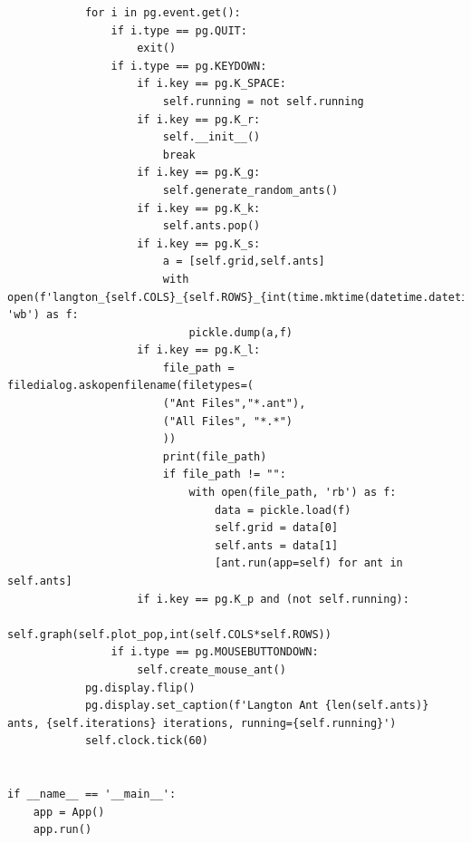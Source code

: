 \documentclass[10pt]{article}
\begin{document}
\begin{verbatim}
            for i in pg.event.get():
                if i.type == pg.QUIT:
                    exit()
                if i.type == pg.KEYDOWN:
                    if i.key == pg.K_SPACE:
                        self.running = not self.running
                    if i.key == pg.K_r:
                        self.__init__()
                        break
                    if i.key == pg.K_g:
                        self.generate_random_ants()
                    if i.key == pg.K_k:
                        self.ants.pop()
                    if i.key == pg.K_s:
                        a = [self.grid,self.ants]
                        with open(f'langton_{self.COLS}_{self.ROWS}_{int(time.mktime(datetime.datetime.now().timetuple()))}.ant', 'wb') as f:
                            pickle.dump(a,f)
                    if i.key == pg.K_l:
                        file_path = filedialog.askopenfilename(filetypes=(
                        ("Ant Files","*.ant"),
                        ("All Files", "*.*")
                        ))
                        print(file_path)
                        if file_path != "":
                            with open(file_path, 'rb') as f:
                                data = pickle.load(f)
                                self.grid = data[0]
                                self.ants = data[1]
                                [ant.run(app=self) for ant in self.ants]
                    if i.key == pg.K_p and (not self.running):
                        self.graph(self.plot_pop,int(self.COLS*self.ROWS))
                if i.type == pg.MOUSEBUTTONDOWN:
                    self.create_mouse_ant()                   
            pg.display.flip()
            pg.display.set_caption(f'Langton Ant {len(self.ants)} ants, {self.iterations} iterations, running={self.running}')
            self.clock.tick(60)


if __name__ == '__main__':
    app = App()
    app.run()
                \end{verbatim}
    
    
\end{document}
